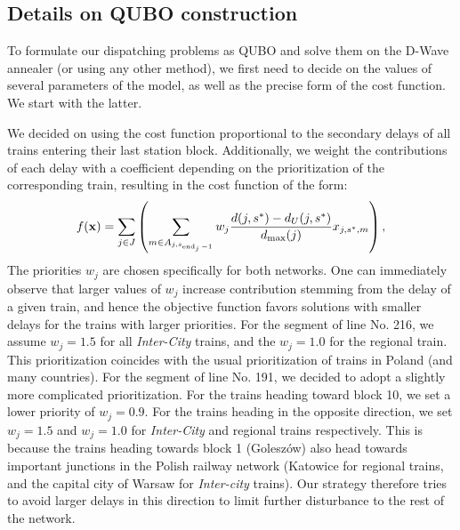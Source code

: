 \subsection{Details on QUBO construction}

To formulate our dispatching problems as QUBO and solve them on the D-Wave
annealer (or using any other method), we first need to decide on the values of
several parameters of the model, as well as the precise form of the cost
function. We start with the latter.

We decided on using the cost function proportional to the secondary delays of
all trains entering their last station block. Additionally, we weight the
contributions of each delay with a coefficient depending on the prioritization
of the corresponding train, resulting in the cost function of the form:
\begin{equation}
  f(\mathbf{x}) = \sum_{j \in J}\left(\sum_{m  \in A_{j,s_{\operatorname*{end}_{j}-1}}}w_{j} \frac{d(j,s^{*}) - d_{U}(j,s^{*})}{d_{\max}(j)}x_{j,s^{*},m}\right),
\end{equation}
The priorities $w_{j}$ are chosen specifically for both networks. One can
immediately observe that larger values of $w_{j}$ increase contribution
stemming from the delay of a given train, and hence the objective function
favors solutions with smaller delays for the trains with larger priorities. For
the segment of line No. 216, we assume $w_{j}= 1.5$ for all \emph{Inter-City}
trains, and the $w_{j}=1.0$ for the regional train. This prioritization
coincides with the usual prioritization of trains in Poland (and many
countries). For the segment of line No. 191, we decided to adopt a slightly
more complicated prioritization. For the trains heading toward block 10, we set
a lower priority of $w_{j}=0.9$. For the trains heading in the opposite
direction, we set $w_{j}=1.5$ and $w_{j}=1.0$ for \emph{Inter-City} and
regional trains respectively. This is because the trains heading towards block
1 (Goleszów) also head towards important junctions in the Polish railway
network (Katowice for regional trains, and the capital city of Warsaw for
\emph{Inter-city} trains). Our strategy therefore tries to avoid larger delays
in this direction to limit further disturbance to the rest of the network.

